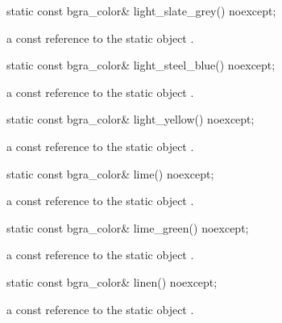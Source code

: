 \begin{itemdecl}
static const bgra_color& light_slate_grey() noexcept;
\end{itemdecl}
\begin{itemdescr}
\pnum
\returns
a const reference to the static  object .
\end{itemdescr}

\begin{itemdecl}
static const bgra_color& light_steel_blue() noexcept;
\end{itemdecl}
\begin{itemdescr}
\pnum
\returns
a const reference to the static  object .
\end{itemdescr}

\begin{itemdecl}
static const bgra_color& light_yellow() noexcept;
\end{itemdecl}
\begin{itemdescr}
\pnum
\returns
a const reference to the static  object .
\end{itemdescr}

\begin{itemdecl}
static const bgra_color& lime() noexcept;
\end{itemdecl}
\begin{itemdescr}
\pnum
\returns
a const reference to the static  object .
\end{itemdescr}

\begin{itemdecl}
static const bgra_color& lime_green() noexcept;
\end{itemdecl}
\begin{itemdescr}
\pnum
\returns
a const reference to the static  object .
\end{itemdescr}

\begin{itemdecl}
static const bgra_color& linen() noexcept;
\end{itemdecl}
\begin{itemdescr}
\pnum
\returns
a const reference to the static  object .
\end{itemdescr}

